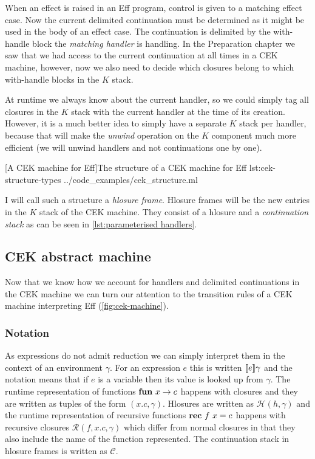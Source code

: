 \documentclass[class=article, crop=false]{standalone}
\begin{document}
When an effect is raised in an Eff program, control is given to a matching
effect case. Now the current delimited continuation must be determined as it
might be used in the body of an effect case. The continuation is delimited by
the with-handle block the \emph{matching handler} is handling. In the
Preparation chapter we saw that we had access to the current continuation at
all times in a CEK machine, however, now we also need to decide which closures
belong to which with-handle blocks in the $K$ stack.

At runtime we always know about the current handler, so we could simply tag all
closures in the $K$ stack with the current handler at the time of its creation.
However, it is a much better idea to simply have a separate $K$ stack per
handler, because that will make the \emph{unwind} operation on the $K$ component
much more efficient (we will unwind handlers and not continuations one by one).

{[A CEK machine for Eff]The structure of a CEK machine for Eff}
{lst:cek-structure-types}
{../code_examples/cek_structure.ml}

I will call such a structure a \emph{hlosure frame}. Hlosure frames will be the
new entries in the $K$ stack of the CEK machine. They consist of a hlosure and
a \emph{continuation stack} as can be seen in
\autoref{lst:parameterised handlers}.


\subsection{CEK abstract machine}

Now that we know how we account for handlers and delimited continuations in the
CEK machine we can turn our attention to the transition rules of a CEK machine
interpreting Eff (\autoref{fig:cek-machine}).

\subsubsection{Notation}

As expressions do not admit reduction we can simply interpret them in the
context of an environment $\gamma$. For an expression $e$ this is written
$\llbracket e \rrbracket\gamma$ and the notation means that if $e$ is a variable then its
value is looked up from $\gamma$. The runtime representation of functions
$\mathbf{fun}\  x \to c$ happens with closures and they are written as tuples of the
form $(x.c, \gamma)$. Hlosures are written as $\mathcal{H}(h, \gamma)$ and the
runtime representation of recursive functions $\mathbf{rec}\  f\ x = c$ happens with
recursive closures $\mathcal{R}(f, x.c, \gamma)$ which differ from normal
closures in that they also include the name of the function represented.
The continuation stack in hlosure frames is written as $\mathcal{C}$.
\end{document}
